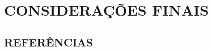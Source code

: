 \documentclass[12pt,a4paper]{article}
\begin{document}
% 

\newpage

\section{CONSIDERAÇÕES FINAIS}


\newpage
{}
\begin{center}
\section*{REFERÊNCIAS} 
\end{center}

\begin{singlespace}
\begin{flushleft}
\renewcommand\refname{}
\vspace*{-1.5cm}

\end{flushleft}
\end{singlespace}


\end{document}
